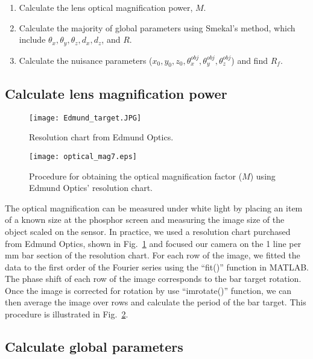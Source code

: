 \begin{enumerate}
\item Calculate the lens optical magnification power, $M$.
\item Calculate the majority of global parameters using Smekal's method, which include $\theta_x, \theta_y, \theta_z, d_x, d_z$, and $R$.
\item Calculate the nuisance parameters ($x_0, y_0, z_0, \theta^{obj}_x, \theta^{obj}_y, \theta^{obj}_z$) and find $R_f$.
\end{enumerate}

\subsection{Calculate lens magnification power}
\begin{figure}[ht]
\centering
\texttt{[image: Edmund\_target.JPG]}
\caption{Resolution chart from Edmund Optics.}
\label{fig:edmund_target}
\end{figure}

\begin{figure}[ht]
\centering
\texttt{[image: optical\_mag7.eps]}
\caption{Procedure for obtaining the optical magnification factor ($M$) using Edmund Optics' resolution chart.}
\label{fig:optical_mag}
\end{figure}
The optical magnification can be measured under white light by placing an item of a known size at the phosphor screen and measuring the image size of the object scaled on the sensor.  In practice, we used a resolution chart purchased from Edmund Optics, shown in Fig.~\ref{fig:edmund_target} and focused our camera on the 1 line per mm bar section of the resolution chart.  For each row of the image, we fitted the data to the first order of the Fourier series using the ``fit()'' function in MATLAB.  The phase shift of each row of the image corresponds to the bar target rotation.  Once the image is corrected for rotation by use ``imrotate()'' function, we can then average the image over rows and calculate the period of the bar target.  This procedure is illustrated in Fig.~\ref{fig:optical_mag}.

\subsection{Calculate global parameters}

